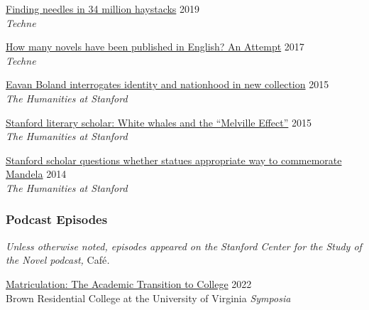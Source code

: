 \documentclass[
  12pt,
  letterpaper,
]{article}
\begin{document}
\href{https://web.archive.org/web/20220430054802/https://litlab.stanford.edu/finding-needles-in-34-million-haystacks/}{Finding
needles in 34 million haystacks} \hfill 2019\\
\hspace*{0.333em} \emph{Techne}

\href{https://web.archive.org/web/20220323072937/https://litlab.stanford.edu/how-many-novels-have-been-published-in-english-an-attempt/}{How
many novels have been published in English? An Attempt} \hfill 2017\\
\hspace*{0.333em} \emph{Techne}

\href{https://web.archive.org/web/20210810123746/https://news.stanford.edu/news/2015/february/boland-country-book-022615.html}{Eavan
Boland interrogates identity and nationhood in new collection}
\hfill 2015\\
\hspace*{0.333em} \emph{The Humanities at Stanford}

\href{https://web.archive.org/web/20210810125202/https://news.stanford.edu/news/2015/may/melville-scholar-boone-051115.html}{Stanford
literary scholar: White whales and the ``Melville Effect''}
\hfill 2015\\
\hspace*{0.333em} \emph{The Humanities at Stanford}

\href{https://web.archive.org/web/20220611230152/https://news.stanford.edu/pr/2014/pr-mandela-statue-parker-120314.html}{Stanford
scholar questions whether statues appropriate way to commemorate
Mandela} \hfill 2014\\
\hspace*{0.333em} \emph{The Humanities at Stanford}

\hypertarget{podcast-episodes}{%
\subsubsection{Podcast Episodes}\label{podcast-episodes}}

\emph{Unless otherwise noted, episodes appeared on the Stanford Center
for the Study of the Novel podcast, }Café\emph{.}

\href{https://virginiaaudio.org/\#/symposia/}{Matriculation: The
Academic Transition to College} \hfill 2022\\
\hspace*{0.333em} Brown Residential College at the University of
Virginia \emph{Symposia}
\end{document}
